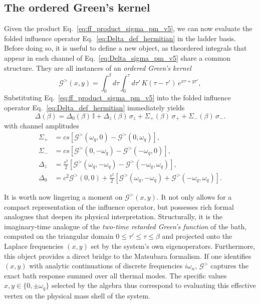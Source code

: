 \subsection{The ordered Green's kernel}
Given the product Eq.~\eqref{eq:ff_product_sigma_pm_v5}, we can now evaluate the
folded influence operator Eq.~\eqref{eq:Delta_def_hermitian} in the ladder basis. Before doing so, it is useful to define a new object, as theordered integrals that appear in each channel of Eq.~\eqref{eq:Delta_sigma_pm_v5}
share a common structure. They are all instances of an \emph{ordered Green's kernel}
\begin{equation}
    \mathcal{G}^>(x,y)
    =
    \int_0^\beta d\tau \int_0^\tau d\tau'\,
    K(\tau-\tau')\,e^{x\tau+y\tau'},
    \label{eq:Gxy_def}
\end{equation}
Substituting Eq.~\eqref{eq:ff_product_sigma_pm_v5} into the folded influence operator
Eq.~\eqref{eq:Delta_def_hermitian} immediately yields
\begin{equation}
    \Delta(\beta)
    = \Delta_0(\beta)\,\mathbb{I}
    + \Delta_z(\beta)\,\sigma_z
    + \Sigma_+(\beta)\,\sigma_+
    + \Sigma_-(\beta)\,\sigma_-.
    \label{eq:Delta_sigma_pm_v5}
\end{equation}
with channel amplitudes
\begin{align}
    \Sigma_+ &= cs\!\left[\mathcal{G}^>(\omega_q,0)-\mathcal{G}^>(0,\omega_q)\right], \label{eq:Sigma_plus_G_v5}\\
    \Sigma_- &= cs\!\left[\mathcal{G}^>(0,-\omega_q)-\mathcal{G}^>(-\omega_q,0)\right], \label{eq:Sigma_minus_G_v5}\\
    \Delta_z &= \frac{s^2}{2}\!\left[\mathcal{G}^>(\omega_q,-\omega_q)-\mathcal{G}^>(-\omega_q,\omega_q)\right], \label{eq:Delta_z_G_v5}\\
    \Delta_0 &= c^2\mathcal{G}^>(0,0)
    +\frac{s^2}{2}\!\left[\mathcal{G}^>(\omega_q,-\omega_q)+\mathcal{G}^>(-\omega_q,\omega_q)\right]. \label{eq:Delta_0_G_v5}
\end{align}

It is worth now lingering a moment on $\mathcal{G}^>(x,y)$. It not only allows for a compact representation of the influence operator, but possesses rich formal analogues that deepen its physical interpretation. Structurally, it is the imaginary-time analogue of the \emph{two-time retarded Green's function}
of the bath, computed on the triangular domain $0\le\tau'\le\tau\le\beta$ and
projected onto the Laplace frequencies $(x,y)$ set by the system's own
eigenoperators. Furthermore, this object provides a direct bridge to the Matsubara formalism. If one identifies $(x,y)$ with analytic continuations of discrete frequencies $i\omega_n$, $\mathcal{G}^>$ captures the exact bath response summed over all thermal modes. The specific values $x,y \in \{0, \pm\omega_q\}$ selected by the algebra thus correspond to evaluating this effective vertex on the physical mass shell of the system.

